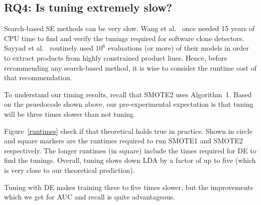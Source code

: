 \subsection{\textbf{RQ4: Is tuning extremely slow?}}

Search-based SE methods can be very slow. Wang et al.~\cite{wang2013searching} once needed 15
years of CPU time to find and verify the tunings required for software
clone detectors. Sayyad et al.~\cite{sayyad2013scalable} routinely used
$10^6$ evaluations (or more) of their models in order to extract
products from highly constrained product
lines. Hence, before recommending any
search-based method, it is wise to consider the runtime cost of that
recommendation.

To understand our timing results, recall that SMOTE2 uses
Algorithm~1. Based on the psuedocode
shown above, our pre-experimental expectation is that
tuning will be three times slower than not tuning.
 
Figure~\ref{runtimes} check if that theoretical
holds true in practice. Shown in circle and square markers are the
  runtimes required to run SMOTE1 and SMOTE2 respectively.  The
  longer runtimes (in square) include the times required for DE to find
  the tunings. Overall, tuning slows down LDA by a factor of up to
  five (which is very close to our theoretical prediction).

\begin{lesson}
    Tuning with DE makes training three to five times slower, but the improvements which we get for AUC and recall is quite advantageous.
\end{lesson}
